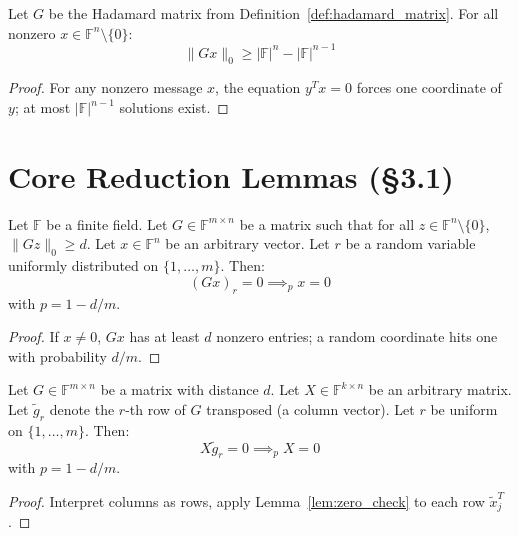 \begin{lemma}\label{lem:hadamard_distance}\leanok {}
Let $G$ be the Hadamard matrix from Definition~\ref{def:hadamard_matrix}. For all nonzero $x \in \mathbb{F}^n \setminus \{0\}$:
\[ \|Gx\|_0 \geq |\mathbb{F}|^n - |\mathbb{F}|^{n-1} \]
\end{lemma}
\begin{proof} \leanok
For any nonzero message $x$, the equation $y^T x = 0$ forces one coordinate of $y$; at most $|\mathbb{F}|^{n-1}$ solutions exist.
\end{proof}

\section*{Core Reduction Lemmas (§3.1)}

\begin{lemma}\label{lem:zero_check}\leanok {}
Let $\mathbb{F}$ be a finite field. Let $G \in \mathbb{F}^{m \times n}$ be a matrix such that for all $z \in \mathbb{F}^n \setminus \{0\}$, $\|Gz\|_0 \geq d$.
Let $x \in \mathbb{F}^n$ be an arbitrary vector. Let $r$ be a random variable uniformly distributed on $\{1, \ldots, m\}$.
Then:
\[ (Gx)_r = 0 \implies_{p} x = 0 \]
with $p = 1 - d/m$.
\end{lemma}
\begin{proof} \leanok
If $x \neq 0$, $Gx$ has at least $d$ nonzero entries; a random coordinate hits one with probability $d/m$.
\end{proof}

\begin{lemma}\label{lem:matrix_zero_check}\leanok
{} 
Let $G \in \mathbb{F}^{m \times n}$ be a matrix with distance $d$.
Let $X \in \mathbb{F}^{k \times n}$ be an arbitrary matrix. Let $\tilde{g}_r$ denote the $r$-th row of $G$ transposed (a column vector).
Let $r$ be uniform on $\{1, \ldots, m\}$.
Then:
\[ X\tilde{g}_r = 0 \implies_{p} X = 0 \]
with $p = 1 - d/m$.
\end{lemma}
\begin{proof} \leanok
Interpret columns as rows, apply Lemma~\ref{lem:zero_check} to each row $\tilde{x}_j^T$.
\end{proof}


